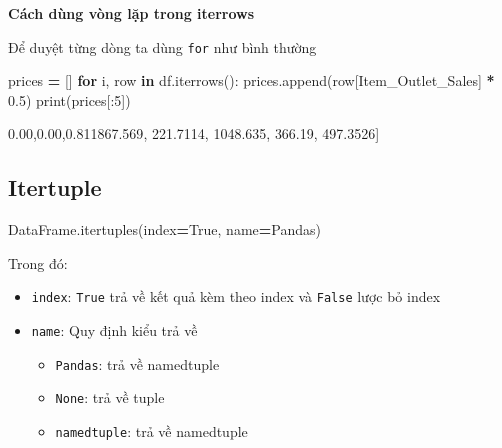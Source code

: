\documentclass[
]{book}
\newenvironment{Shaded}{\begin{snugshade}}{\end{snugshade}}
\newcommand{\BuiltInTok}[1]{#1}
\newcommand{\ControlFlowTok}[1]{\textcolor[rgb]{0.13,0.29,0.53}{\textbf{#1}}}
\newcommand{\DecValTok}[1]{\textcolor[rgb]{0.00,0.00,0.81}{#1}}
\newcommand{\FloatTok}[1]{\textcolor[rgb]{0.00,0.00,0.81}{#1}}
\newcommand{\KeywordTok}[1]{\textcolor[rgb]{0.13,0.29,0.53}{\textbf{#1}}}
\newcommand{\NormalTok}[1]{#1}
\newcommand{\OperatorTok}[1]{\textcolor[rgb]{0.81,0.36,0.00}{\textbf{#1}}}
\newcommand{\StringTok}[1]{\textcolor[rgb]{0.31,0.60,0.02}{#1}}
\newcommand{\VariableTok}[1]{\textcolor[rgb]{0.00,0.00,0.00}{#1}}
\providecommand{\tightlist}{%
  \setlength{\itemsep}{0pt}\setlength{\parskip}{0pt}}
\begin{document}
\textbf{Cách dùng vòng lặp trong iterrows}

Để duyệt từng dòng ta dùng \texttt{for} như bình thường

\begin{Shaded}
\begin{Highlighting}[]
\NormalTok{prices }\OperatorTok{=}\NormalTok{ []}
\ControlFlowTok{for}\NormalTok{ i, row }\KeywordTok{in}\NormalTok{ df.iterrows():}
\NormalTok{    prices.append(row[}\StringTok{\textquotesingle{}Item\_Outlet\_Sales\textquotesingle{}}\NormalTok{] }\OperatorTok{*} \FloatTok{0.5}\NormalTok{)}
\BuiltInTok{print}\NormalTok{(prices[:}\DecValTok{5}\NormalTok{])}
\end{Highlighting}
\end{Shaded}

\begin{Shaded}
\begin{Highlighting}[]
\NormalTok{[}\FloatTok{1867.569}\NormalTok{, }\FloatTok{221.7114}\NormalTok{, }\FloatTok{1048.635}\NormalTok{, }\FloatTok{366.19}\NormalTok{, }\FloatTok{497.3526}\NormalTok{]}
\end{Highlighting}
\end{Shaded}

\subsection{Itertuple}\label{itertuple}

\begin{Shaded}
\begin{Highlighting}[]
\NormalTok{DataFrame.itertuples(index}\OperatorTok{=}\VariableTok{True}\NormalTok{, name}\OperatorTok{=}\StringTok{\textquotesingle{}Pandas\textquotesingle{}}\NormalTok{)}
\end{Highlighting}
\end{Shaded}

Trong đó:

\begin{itemize}
\item
  \texttt{index}: \texttt{True} trả về kết quả kèm theo index và \texttt{False} lược bỏ index
\item
  \texttt{name}: Quy định kiểu trả về

  \begin{itemize}
  \tightlist
  \item
    \texttt{Pandas}: trả về namedtuple
  \item
    \texttt{None}: trả về tuple
  \item
    \texttt{namedtuple}: trả về namedtuple
  \end{itemize}
\end{itemize}
\end{document}
